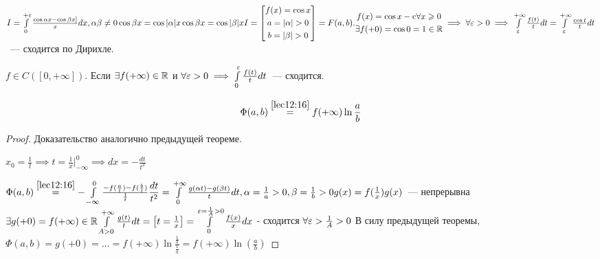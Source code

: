 \documentclass[../../main.tex]{subfiles}
\begin{document}
	\begin{exmp}
		$I = \int\limits_0^{+\varepsilon} \frac{\cos \alpha x - \cos \beta x]}{x} dx, 
		\alpha\beta \neq 0
		\\
		\cos \beta x = \cos |\alpha| x
		\\
		\cos \beta x = \cos |\beta| x
		\\
		I = \left[ \begin{gathered} f(x) = \cos x \\ a = |\alpha| > 0 \\ b = |\beta| 
		> 0 \end{gathered} \right]
		= F(a, b).
		\\ 
		\begin{gathered} f(x) = \cos x  - \textup{c} \forall x \geqslant 0 \\ \exists 
		f(+0) = \cos 0 = 1 \in \mathbb{R} \end{gathered} \implies \forall \varepsilon > 0 \implies 
		\int\limits_{\varepsilon}^{+\infty} \frac{f(t)}{t} dt = 
		\int\limits_{\varepsilon}^{+\infty} \frac{\cos t}{t} dt$~--- сходится по Дирихле.
	\end{exmp}

	\begin{thm}
		$f \in C([0, +\infty])$. Если $\exists f(+\infty) \in \mathbb{R}$ и  $\forall \varepsilon > 
		0 \implies \int\limits_0^{\varepsilon} \frac{f(t)}{t} dt$~--- сходится.
		
		\begin{equation}
			\label{lab13:20}
			\Phi(a, b) \stk{lec12:16}= f(+\infty) \ln \frac{a}{b}
		\end{equation}
	\end{thm}

	\begin{proof}
		Доказательство аналогично предыдущей теореме.
		
		$x_0 = \frac{1}{t} \implies t = \frac{1}{x}|^0_{-\infty} \implies dx = - 
		\frac{dt}{t^2}$
		
		$\Phi(a, b) \stk{lec12:16} = - \int\limits_{-\infty}^0 
		\frac{-f(\frac{a}{t})-f(\frac{b}{t})}{\frac{1}{t}} \dfrac{dt}{t^2} = 
		\int\limits_0^{+\infty} \frac{g(\alpha t) - g(\beta t)}{t} dt, 
		\\
		\alpha = \frac{1}{a} > 0, \beta = \frac{1}{b} > 0
		\\
		g(x) = f(\frac{1}{x})
		\\
		g(x)$~--- непрерывна
		$
		\exists g(+0) = f(+\infty) \in \mathbb{R}
		\\
		\int\limits_{A > 0}^{+\infty} \frac{g(t)}{t} dt = \left[ t = \frac{1}{x} 
		\right] = \int\limits_0^{\varepsilon = \frac{1}{A} > 0} \frac{f(x)}{x} dx$ - 
		сходится $\forall \varepsilon > \frac{1}{A} > 0 $
		В силу предыдущей теоремы, $\Phi(a, b) = g(+0) = \ldots = f(+\infty) \ln 
		\frac{\frac{1}{b}}{\frac{1}{a}} = f(+\infty) \ln (\frac{a}{b})$
	\end{proof}
\end{document}
